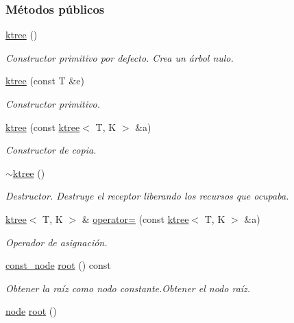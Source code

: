 \subsubsection*{Métodos públicos}
\begin{DoxyCompactItemize}
\item 
\hyperlink{classktree_a70c8511d0c0fc199f341065fab0aa0ad}{ktree} ()
\begin{DoxyCompactList}\small\item\em Constructor primitivo por defecto. Crea un árbol nulo. \end{DoxyCompactList}\item 
\hyperlink{classktree_ae26a47d96a8630c9bcd3c85b34873291}{ktree} (const T \&e)
\begin{DoxyCompactList}\small\item\em Constructor primitivo. \end{DoxyCompactList}\item 
\hyperlink{classktree_a3590e97c7bc6556340337c30d382b23d}{ktree} (const \hyperlink{classktree}{ktree}$<$ T, K $>$ \&a)
\begin{DoxyCompactList}\small\item\em Constructor de copia. \end{DoxyCompactList}\item 
\hyperlink{classktree_ac567238116c54fc47a65d65a3f69151c}{$\sim$ktree} ()
\begin{DoxyCompactList}\small\item\em Destructor. Destruye el receptor liberando los recursos que ocupaba. \end{DoxyCompactList}\item 
\hyperlink{classktree}{ktree}$<$ T, K $>$ \& \hyperlink{classktree_ac2305e0ca7b7f7d96c7e978fc7240e71}{operator=} (const \hyperlink{classktree}{ktree}$<$ T, K $>$ \&a)
\begin{DoxyCompactList}\small\item\em Operador de asignación. \end{DoxyCompactList}\item 
\hyperlink{classktree_1_1const__node}{const\+\_\+node} \hyperlink{classktree_a2d252651d05d9a107c009fcfdfc91df4}{root} () const 
\begin{DoxyCompactList}\small\item\em Obtener la raíz como nodo constante.\+Obtener el nodo raíz. \end{DoxyCompactList}\item 
\hyperlink{classktree_1_1node}{node} \hyperlink{classktree_a8e0380e91ee04cc45541e15e14d8c8ea}{root} ()

\end{DoxyCompactItemize}
